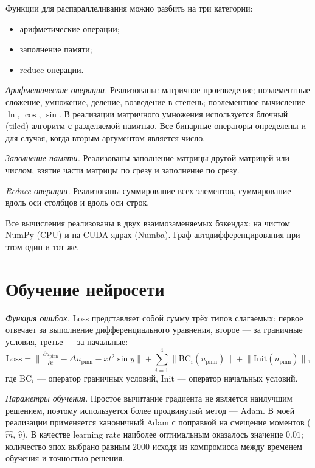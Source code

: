 \documentclass[12pt,a4paper]{article}
\begin{document}
Функции для распараллеливания можно разбить на три категории:
\begin{itemize}
  \item арифметические операции;
  \item заполнение памяти;
  \item reduce-операции.
\end{itemize}

\emph{Арифметические операции.} Реализованы: матричное произведение;
поэлементные сложение, умножение, деление, возведение в степень; поэлементное
вычисление $\ln$, $\cos$, $\sin$. В реализации матричного умножения используется
блочный (tiled) алгоритм с разделяемой памятью. Все бинарные операторы
определены и для случая, когда вторым аргументом является число.

\emph{Заполнение памяти.} Реализованы заполнение матрицы другой матрицей или
числом, взятие части матрицы по срезу и заполнение по срезу.

\emph{Reduce-операции.} Реализованы суммирование всех элементов, суммирование
вдоль оси столбцов и вдоль оси строк.

Все вычисления реализованы в двух взаимозаменяемых бэкендах: на чистом NumPy
(CPU) и на CUDA-ядрах (Numba). Граф автодифференцирования при этом один и тот
же.

\section{Обучение нейросети}

\emph{Функция ошибок.} Loss представляет собой сумму трёх типов слагаемых:
первое отвечает за выполнение дифференциального уравнения, второе --- за
граничные условия, третье --- за начальные:
\[
\text{Loss} = \Big\| \tfrac{\partial u_{\text{pinn}}}{\partial t} - \Delta u_{\text{pinn}} - x t^2 \sin y \Big\|
 + \sum_{i=1}^{4} \big\| \mathrm{BC}_i(u_{\text{pinn}}) \big\|
 + \big\| \mathrm{Init}(u_{\text{pinn}}) \big\|,
\]
где $\mathrm{BC}_i$ --- оператор граничных условий, $\mathrm{Init}$ --- оператор
начальных условий.

\emph{Параметры обучения.} Простое вычитание градиента не является наилучшим
решением, поэтому используется более продвинутый метод --- Adam. В моей
реализации применяется каноничный Adam с поправкой на смещение моментов
($\hat{m}$, $\hat{v}$). В качестве learning rate наиболее оптимальным оказалось
значение $0.01$; количество эпох выбрано равным $2000$ исходя из компромисса
между временем обучения и точностью решения.
\end{document}
